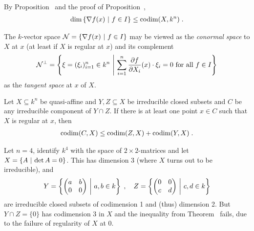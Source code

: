 \documentclass[a4paper,parskip=half,numbers=enddot, DIV=12]{scrreprt}
\begin{document}
		
\begin{rem*}
    By Proposition~ and the proof of Proposition~, 
    \begin{align*}
        \dim\left\{\nabla f(x)\ \middle|\  f\in I\right\} \leq \operatorname{codim}(X,k^n)\;.
    \end{align*}
\end{rem*}
\begin{rem}
    The $k$-vector space $\mathcal{N} = \left\{\nabla f(x) \ \middle|\  f\in I\right\}$ may be viewed as the \emph{conormal space} to $X$ at $x$ (at least if $X$ is regular at $x$) and its complement 
    \begin{align*}
        \mathcal{N}^\perp = \left\{ \xi = (\xi_i)_{i=1}^n \in k^n \ \middle|\  \sum_{i=1}^{n}\frac{\partial f}{\partial X_i}(x)\cdot\xi_i=0 \text{ for all } f\in I\right\}
    \end{align*}
    as the \emph{tangent space} at $x$ of $X$.
\end{rem}
\begin{thm}
    Let $X\subseteq k^n$ be quasi-affine and $Y,Z \subseteq X$ be irreducible closed subsets and $C$ be any irreducible component of $Y\cap Z$. If there is at least one point $x\in C$ such that $X$ is regular at $x$, then 
    \begin{align*}
    	\operatorname{codim}(C,X) \leq \operatorname{codim} (Z,X)+\operatorname{codim}(Y,X)\;.
    \end{align*}
\end{thm}
\begin{rem}
    Let $n=4$, identify $k^4$ with the space of $2\times 2$-matrices and let $X= \left\{ A\ \middle|\  \operatorname{det} A = 0\right\}$. This has dimension 3 (where $X$ turns out to be irreducible), and 
    \begin{align*}
        Y = \left\{\begin{pmatrix} a&b\\ 0&0\end{pmatrix} \ \middle|\  a,b\in k \right\}\;,\quad
        Z = \left\{\begin{pmatrix} 0&0\\ c&d\end{pmatrix} \ \middle|\  c,d\in k \right\}
    \end{align*}  
    are irreducible closed subsets of codimension 1 and (thus) dimension 2. But $Y\cap Z = \{0\}$ has codimension 3 in $X$ and the inequality from Theorem~ fails, due to the failure of regularity of $X$ at $0$.
\end{rem}
\end{document}
